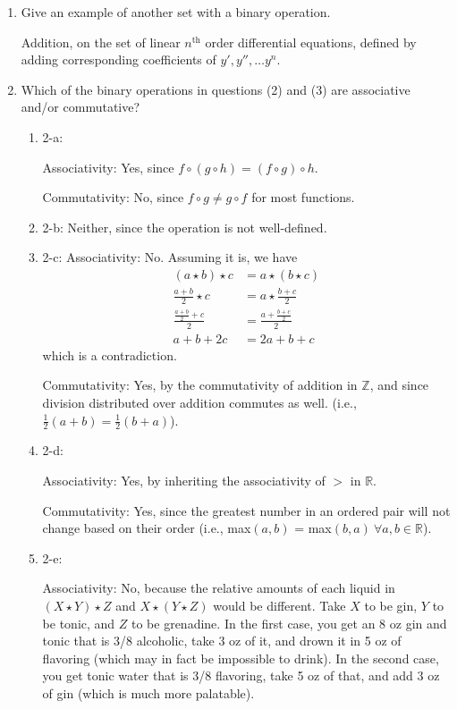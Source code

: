 \documentclass{scrartcl}
\begin{document}
\begin{enumerate}
\begin{enumerate}
		\end{enumerate}
		
	\item Give an example of another set with a binary operation.
	
		Addition, on the set of linear $n^{\textrm{th}}$ order differential equations, defined by adding corresponding coefficients of $y', y'', \dots y^n$.
			
	\item Which of the binary operations in questions (2) and (3) are associative and/or commutative?
		\begin{enumerate}
			\item 2-a: 
			
				Associativity: Yes, since $f\circ (g\circ h) = (f\circ g)\circ h$.
				
				Commutativity: No, since $f\circ g \neq g\circ f$ for most functions.
				
			\item 2-b:
				Neither, since the operation is not well-defined.
				
			\item 2-c:
				Associativity: No. Assuming it is, we have
				\begin{align*}
					(a\star b)\star c &= a\star (b\star c) \\
					\frac{a+b}{2}\star c &= a\star \frac{b+c}{2} \\
					\frac{\frac{a+b}{2}+c}{2} &= \frac{a+\frac{b+c}{2}}{2} \\
					a + b + 2c &= 2a + b +c
				\end{align*}
				which is a contradiction.
				
				Commutativity: Yes, by the commutativity of addition in $\mathbb{Z}$, and since division distributed over addition commutes as well. (i.e., $\frac{1}{2}(a+b) = \frac{1}{2}(b+a)$).
				
				\item 2-d: 
				
					Associativity: Yes, by inheriting the associativity of $>$ in $\mathbb{R}$.
					
					Commutativity: Yes, since the greatest number in an ordered pair will not change based on their order (i.e., max$(a,b)$ = max$(b,a)\ \forall a,b\in \mathbb{R}$).
					
				\item 2-e:
					
					Associativity: No, because the relative amounts of each liquid in $(X\star Y)\star Z$ and $X\star (Y\star Z)$ would be different. Take $X$ to be gin, $Y$ to be tonic, and $Z$ to be grenadine. In the first case, you get an 8 oz gin and tonic that is 3/8 alcoholic, take 3 oz of it, and drown it in 5 oz of flavoring (which may in fact be impossible to drink). In the second case, you get tonic water that is 3/8 flavoring, take 5 oz of that, and add 3 oz of gin (which is much more palatable).
						

\end{enumerate}
\end{enumerate}
\end{document}
